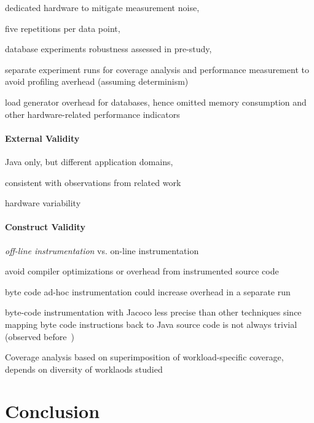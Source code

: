 \begin{compactitem}
	\item dedicated hardware to mitigate measurement noise, 
	\item five repetitions per data point, 
	\item database experiments robustness assessed in pre-study,
	\item separate experiment runs for coverage analysis and performance measurement to avoid profiling averhead (assuming determinism)
	\item load generator overhead for databases, hence omitted memory consumption and other hardware-related performance indicators 
\end{compactitem}

\paragraph{External Validity}\label{sec:external_validity}
\begin{compactitem}
	\item Java only, but different application domains,
	\item consistent with observations from related work
	\item hardware variability
\end{compactitem}

\paragraph{Construct Validity}\label{sec:construct_validity}
\begin{compactitem}
	\item \textit{off-line instrumentation} vs. on-line instrumentation
	\begin{compactitem}
		\item avoid compiler optimizations or overhead from instrumented source code
		\item byte code ad-hoc instrumentation could increase overhead in a separate run
		\item byte-code instrumentation with Jacoco less precise than other techniques since mapping byte code instructions back to Java source code is not always trivial (observed before~\cite{luo_2019_cova})
	\end{compactitem}
	\item Coverage analysis based on superimposition of workload-specific coverage, depends on diversity of worklaods studied
\end{compactitem}

\section{Conclusion}